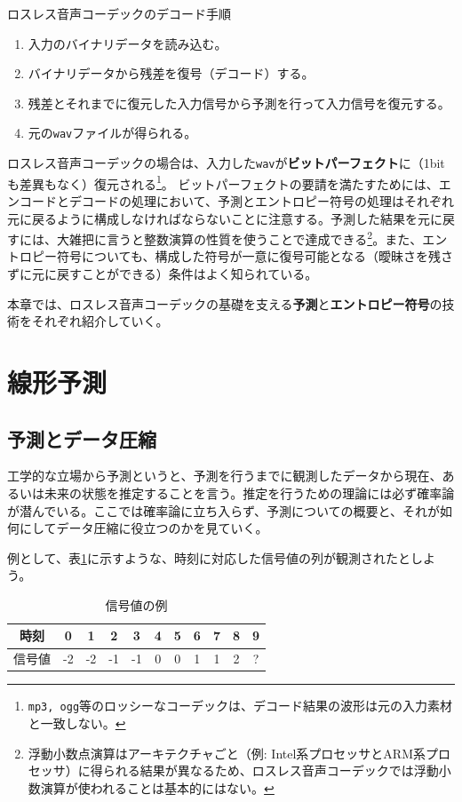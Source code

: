 \documentclass[uplatex,dvipdfmx,b5j,10pt]{jsbook}
\theoremstyle{definition}
\begin{document}
\begin{itembox}[l]{ロスレス音声コーデックのデコード手順}
  \begin{enumerate}
    \item 入力のバイナリデータを読み込む。
    \item バイナリデータから残差を復号（デコード）する。
    \item 残差とそれまでに復元した入力信号から予測を行って入力信号を復元する。
    \item 元の\texttt{wav}ファイルが得られる。
  \end{enumerate}
\end{itembox}

ロスレス音声コーデックの場合は、入力した\texttt{wav}が\textbf{ビットパーフェクト}に（1bitも差異もなく）復元される\footnote{\texttt{mp3, ogg}等のロッシーなコーデックは、デコード結果の波形は元の入力素材と一致しない。}。
ビットパーフェクトの要請を満たすためには、エンコードとデコードの処理において、予測とエントロピー符号の処理はそれぞれ元に戻るように構成しなければならないことに注意する。予測した結果を元に戻すには、大雑把に言うと整数演算の性質を使うことで達成できる\footnote{浮動小数点演算はアーキテクチャごと（例: Intel系プロセッサとARM系プロセッサ）に得られる結果が異なるため、ロスレス音声コーデックでは浮動小数演算が使われることは基本的にはない。}。また、エントロピー符号についても、構成した符号が一意に復号可能となる（曖昧さを残さずに元に戻すことができる）条件はよく知られている。

本章では、ロスレス音声コーデックの基礎を支える\textbf{予測}と\textbf{エントロピー符号}の技術をそれぞれ紹介していく。

\section{線形予測}

\subsection{予測とデータ圧縮}

工学的な立場から予測というと、予測を行うまでに観測したデータから現在、あるいは未来の状態を推定することを言う。推定を行うための理論には必ず確率論が潜んでいる。ここでは確率論に立ち入らず、予測についての概要と、それが如何にしてデータ圧縮に役立つのかを見ていく。

例として、表\ref{example_signal}に示すような、時刻に対応した信号値の列が観測されたとしよう。
\begin{table}[htbp]
  \begin{center}
    \caption{信号値の例} \label{example_signal}
    \begin{tabular}{|c|c|c|c|c|c|c|c|c|c|c|}
      \hline
      時刻 & 0 & 1 & 2 & 3 & 4 & 5 & 6 & 7 & 8 & 9  \\ \hline
      信号値 & -2 & -2 & -1 & -1 & 0 & 0 & 1 & 1 & 2 & ? \\ \hline
    \end{tabular}
  \end{center}
\end{table}
\end{document}
